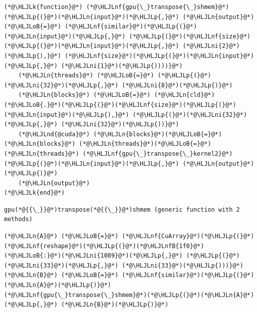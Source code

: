 \documentclass[12pt,a4paper]{article}
\newcommand{\HLJLk}[1]{\textcolor[RGB]{148,91,176}{\textbf{#1}}}
\newcommand{\HLJLn}[1]{#1}
\newcommand{\HLJLnd}[1]{\textcolor[RGB]{214,102,97}{#1}}
\newcommand{\HLJLnf}[1]{\textcolor[RGB]{66,102,213}{#1}}
\newcommand{\HLJLnfB}[1]{\textcolor[RGB]{59,151,46}{#1}}
\newcommand{\HLJLni}[1]{\textcolor[RGB]{59,151,46}{#1}}
\newcommand{\HLJLoB}[1]{\textcolor[RGB]{102,102,102}{\textbf{#1}}}
\newcommand{\HLJLp}[1]{#1}
\begin{document}
\begin{lstlisting}
(*@\HLJLk{function}@*) (*@\HLJLnf{gpu{\_}transpose{\_}shmem}@*)(*@\HLJLp{(}@*)(*@\HLJLn{input}@*)(*@\HLJLp{,}@*) (*@\HLJLn{output}@*) (*@\HLJLoB{=}@*) (*@\HLJLnf{similar}@*)(*@\HLJLp{(}@*)(*@\HLJLn{input}@*)(*@\HLJLp{,}@*) (*@\HLJLp{(}@*)(*@\HLJLnf{size}@*)(*@\HLJLp{(}@*)(*@\HLJLn{input}@*)(*@\HLJLp{,}@*) (*@\HLJLni{2}@*)(*@\HLJLp{),}@*) (*@\HLJLnf{size}@*)(*@\HLJLp{(}@*)(*@\HLJLn{input}@*)(*@\HLJLp{,}@*) (*@\HLJLni{1}@*)(*@\HLJLp{))))}@*)
    (*@\HLJLn{threads}@*) (*@\HLJLoB{=}@*) (*@\HLJLp{(}@*)(*@\HLJLni{32}@*)(*@\HLJLp{,}@*) (*@\HLJLni{8}@*)(*@\HLJLp{)}@*)
    (*@\HLJLn{blocks}@*) (*@\HLJLoB{=}@*) (*@\HLJLn{cld}@*)(*@\HLJLoB{.}@*)(*@\HLJLp{(}@*)(*@\HLJLnf{size}@*)(*@\HLJLp{(}@*)(*@\HLJLn{input}@*)(*@\HLJLp{),}@*) (*@\HLJLp{(}@*)(*@\HLJLni{32}@*)(*@\HLJLp{,}@*) (*@\HLJLni{32}@*)(*@\HLJLp{))}@*)
    (*@\HLJLnd{@cuda}@*) (*@\HLJLn{blocks}@*)(*@\HLJLoB{=}@*)(*@\HLJLn{blocks}@*) (*@\HLJLn{threads}@*)(*@\HLJLoB{=}@*)(*@\HLJLn{threads}@*) (*@\HLJLnf{gpu{\_}transpose{\_}kernel2}@*)(*@\HLJLp{(}@*)(*@\HLJLn{input}@*)(*@\HLJLp{,}@*) (*@\HLJLn{output}@*)(*@\HLJLp{)}@*)
    (*@\HLJLn{output}@*)
(*@\HLJLk{end}@*)
\end{lstlisting}

\begin{lstlisting}
gpu(*@{{\_}}@*)transpose(*@{{\_}}@*)shmem (generic function with 2 methods)
\end{lstlisting}


\begin{lstlisting}
(*@\HLJLn{A}@*) (*@\HLJLoB{=}@*) (*@\HLJLnf{CuArray}@*)(*@\HLJLp{(}@*)(*@\HLJLnf{reshape}@*)(*@\HLJLp{(}@*)(*@\HLJLnfB{1f0}@*)(*@\HLJLoB{:}@*)(*@\HLJLni{1089}@*)(*@\HLJLp{,}@*) (*@\HLJLp{(}@*)(*@\HLJLni{33}@*)(*@\HLJLp{,}@*) (*@\HLJLni{33}@*)(*@\HLJLp{)))}@*)
(*@\HLJLn{B}@*) (*@\HLJLoB{=}@*) (*@\HLJLnf{similar}@*)(*@\HLJLp{(}@*)(*@\HLJLn{A}@*)(*@\HLJLp{)}@*)
(*@\HLJLnf{gpu{\_}transpose{\_}shmem}@*)(*@\HLJLp{(}@*)(*@\HLJLn{A}@*)(*@\HLJLp{,}@*) (*@\HLJLn{B}@*)(*@\HLJLp{)}@*)
\end{lstlisting}
\end{document}
